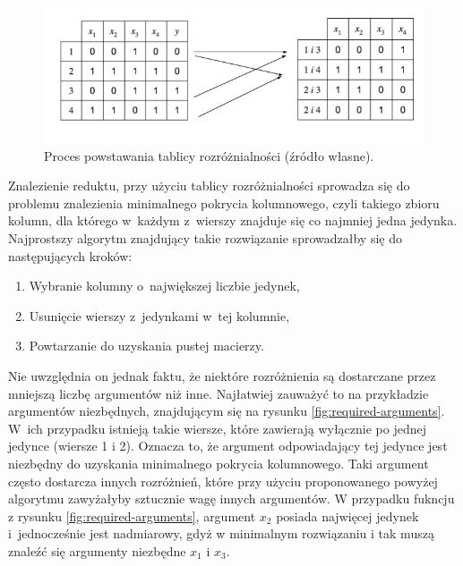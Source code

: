 \begin{figure}[h]
\centering
\includegraphics[width = 13cm]{chapter02/discernibility-table.png}
\caption{Proces powstawania tablicy rozróżnialności (źródło własne).}
\label{fig:discernibility-table}
\end{figure}

Znalezienie reduktu,
przy użyciu tablicy rozróżnialności sprowadza się do problemu znalezienia minimalnego pokrycia kolumnowego,
czyli takiego zbioru kolumn,
dla którego w~każdym z~wierszy znajduje się co najmniej jedna jedynka.
Najprostszy algorytm znajdujący takie rozwiązanie sprowadzałby się do następujących kroków:
\begin{enumerate}
\item Wybranie kolumny o~największej liczbie jedynek,
\item Usunięcie wierszy z~jedynkami w~tej kolumnie,
\item Powtarzanie do uzyskania pustej macierzy.
\end{enumerate}

Nie uwzględnia on jednak faktu,
że niektóre rozróżnienia są dostarczane przez mniejszą liczbę argumentów niż inne.
Najłatwiej zauważyć to na przykładzie argumentów niezbędnych, znajdującym się na rysunku \ref{fig:required-arguments}.
W~ich przypadku istnieją takie wiersze,
które zawierają wyłącznie po jednej jedynce (wiersze 1 i 2).
Oznacza to,
że argument odpowiadający tej jedynce jest niezbędny do uzyskania minimalnego pokrycia kolumnowego.
Taki argument często dostarcza innych rozróżnień,
które przy użyciu proponowanego powyżej algorytmu zawyżałyby sztucznie wagę innych argumentów.
W przypadku fukncju z rysunku \ref{fig:required-arguments},
argument $x_2$ posiada najwięcej jedynek i~jednocześnie jest nadmiarowy,
gdyż w minimalnym rozwiązaniu i tak muszą znaleźć się argumenty niezbędne $x_1$ i $x_3$.

